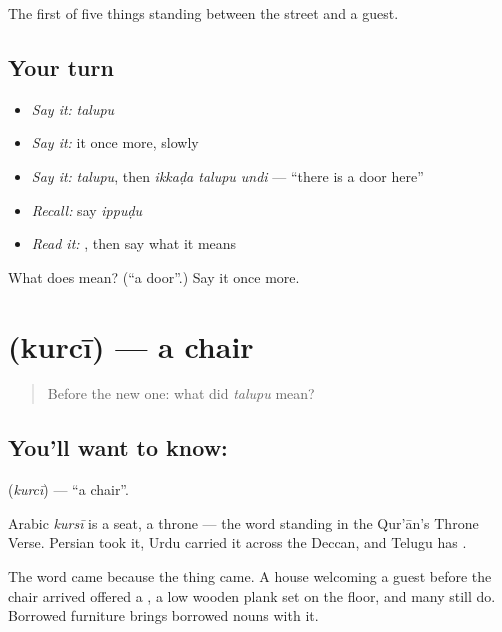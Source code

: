 \begin{grammarlens}[title={What you've built}]
The first of five things standing between the street and a guest.
\end{grammarlens}

\subsection*{Your turn}
\begin{itemize}
\raggedright
  \item \emph{Say it:} \emph{talupu}
  \item \emph{Say it:} it once more, slowly
  \item \emph{Say it:} \emph{talupu}, then \emph{ikkaḍa talupu undi} — \textquotedblleft{}there is a door here\textquotedblright{}
  \item \emph{Recall:} say \emph{ippuḍu}
  \item \emph{Read it:} \textbf{}, then say what it means
\end{itemize}

\begin{tcolorbox}[breakable,colback=teal!4,colframe=teal!35!black,title={Before you move on}]
What does  mean? (\textquotedblleft{}a door\textquotedblright{}.) Say it once more.
\end{tcolorbox}
\section[\texorpdfstring{\te{కుర్చీ} (kurcī)}{కుర్చీ (kurcī)}]{ (kurcī) — a chair}

\label{lesson:TE-C52-chair}



\begin{quote}
Before the new one: what did \emph{talupu} mean?
\end{quote}

\subsection*{You'll want to know: }
\textbf{} (\emph{kurcī}) — \textquotedblleft{}a chair\textquotedblright{}.

Arabic \emph{kursī} is a seat, a throne — the word standing in the Qur'ān's Throne Verse. Persian took it, Urdu carried it across the Deccan, and Telugu has .

The word came because the thing came. A house welcoming a guest before the chair arrived offered a , a low wooden plank set on the floor, and many still do. Borrowed furniture brings borrowed nouns with it.

